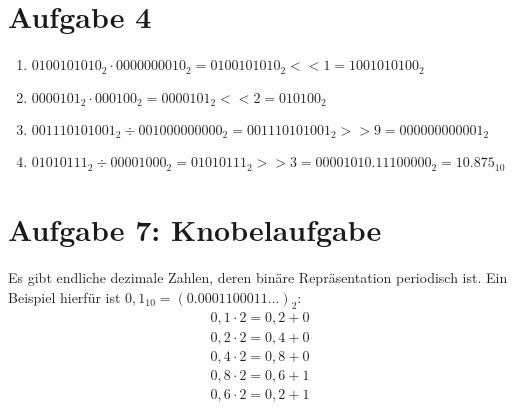 \documentclass[a4paper]{article}
\begin{document}
\section*{Aufgabe 4}
\begin{enumerate}[label=\alph*)]
    \item $0100101010_2 \cdot 0000000010_2 = 0100101010_2 << 1 = 1001010100_2$
    \item $0000101_2 \cdot 000100_2 = 0000101_2 << 2 = 010100_2$
    \item $001110101001_2 \div 001000000000_2 = 001110101001_2 >> 9 =000000000001_2 $
    \item $01010111_2 \div 00001000_2 = 01010111_2 >> 3 = 00001010.11100000_2 = 10.875_{10}$
\end{enumerate}

\section*{Aufgabe 7: Knobelaufgabe}
Es gibt endliche dezimale Zahlen, deren binäre Repräsentation periodisch ist. Ein Beispiel hierfür ist $0,1_{10} = (0.0001100011...)_2:$
\begin{align*}
	0,1 \cdot 2 = 0,2 + 0 \\
	0,2 \cdot 2 = 0,4 + 0 \\
	0,4 \cdot 2 = 0,8 + 0 \\
	0,8 \cdot 2 = 0,6 + 1 \\
	0,6 \cdot 2 = 0,2 + 1
\end{align*}
\end{document}
